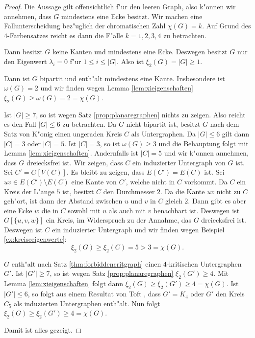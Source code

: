 \begin{proof}
  Die Aussage gilt offensichtlich f"ur den leeren Graph, also k"onnen wir annehmen, dass $G$ mindestens eine Ecke besitzt.
  Wir machen eine Fallunterscheidung bez"uglich der chromatischen Zahl $\chi(G)=k$. Auf Grund des $4$-Farbensatzes reicht es dann die F"alle $k=1,2,3,4$ zu betrachten.

   Dann besitzt $G$ keine Kanten und mindestens eine Ecke. Deswegen besitzt $G$ nur den Eigenwert $\lambda_i = 0$ f"ur $1 \leq i \leq |G|$. Also ist $\xi_{2}(G) = |G| \geq 1$.

   Dann ist $G$ bipartit und enth"alt mindestens eine Kante. Insbesondere ist $\omega(G) = 2$ und wir finden wegen Lemma \ref{lem:xieigenschaften} $\xi_{2}(G) \geq \omega(G) = 2 = \chi(G)$.

   Ist $|G| \geq 7$, so ist wegen Satz \ref{prop:planaregraphen} nichts zu zeigen. Also reicht es den Fall $|G| \leq 6$ zu betrachten. Da $G$ nicht bipartit ist, besitzt $G$ nach dem Satz von K"onig einen ungeraden Kreis $C$ als Untergraphen. Da $|G| \leq 6$ gilt dann $|C| = 3$ oder  $|C| = 5$.
  Ist $|C| = 3$, so ist $\omega(G) \geq 3$ und die Behauptung folgt mit Lemma \ref{lem:xieigenschaften}. 
  Andernfalls ist $|C| = 5$ und wir k"onnen annehmen, dass $G$ dreiecksfrei ist. Wir zeigen, dass $C$ ein induzierter Untergraph von $G$ ist. Sei $C' = G[V(C)]$. Es bleibt zu zeigen, dass $E(C') = E(C)$ ist. Sei $uv\in E(C')\setminus E(C)$ eine Kante von $C'$, welche nicht in $C$ vorkommt. 
  Da $C$ ein Kreis der L"ange $5$ ist, besitzt $C$ den Durchmesser $2$. Da die Kante $uv$ nicht zu $C$ geh"ort, ist dann der Abstand zwischen $u$ und $v$ in $C$ gleich $2$. 
  Dann gibt es aber eine Ecke $w$ die in $C$ sowohl mit $u$ als auch mit $v$ benachbart ist.
  Deswegen ist $G[\{u,v,w\}]$ ein Kreis, im Widerspruch zu der Annahme, das $G$ dreiecksfrei ist.
  Deswegen ist $C$ ein induzierter Untergraph und wir finden wegen Beispiel \ref{ex:kreiseeigenwerte}:
  $$\xi_{2}(G) \geq \xi_{2}(C) = 5 > 3 = \chi(G).$$

   $G$ enth"alt nach Satz \ref{thm:forbiddencritgraph} einen $4$-kritischen Untergraphen $G'$. Ist $|G'| \geq 7$, so ist wegen Satz \ref{prop:planaregraphen} $\xi_{2}(G') \geq 4$. Mit Lemma \ref{lem:xieigenschaften} folgt dann $\xi_{2}(G) \geq \xi_{2}(G') \geq 4 = \chi(G)$.
  Ist $|G'| \leq 6$, so folgt aus einem Resultat von Toft \cite{Toft74b}, dass $G' = K_4$ oder $G'$ den Kreis $C_5$ als induzierten Untergraphen enth"alt. Nun folgt $\xi_{2}(G) \geq \xi_{2}(G') \geq 4 = \chi(G)$. 

  Damit ist alles gezeigt.
\end{proof}

